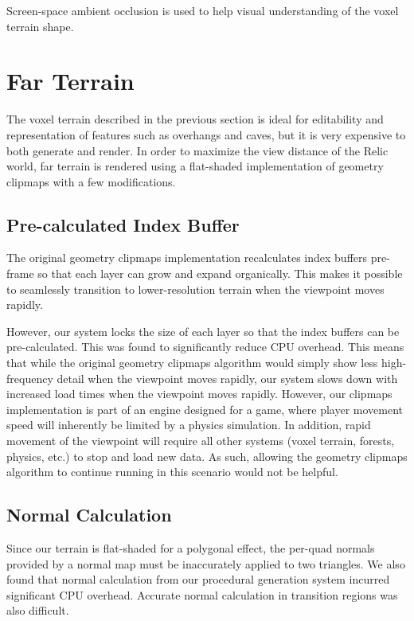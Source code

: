 Screen-space ambient occlusion is used to help visual understanding of the voxel terrain shape.


\section{Far Terrain} \label{clipterrain} %

The voxel terrain described in the previous section is ideal for editability and representation of features such as overhangs and caves, but it is very expensive to both generate and render.
In order to maximize the view distance of the Relic world, far terrain is rendered using a flat-shaded implementation of geometry clipmaps with a few modifications.

\subsection{Pre-calculated Index Buffer}

The original geometry clipmaps implementation recalculates index buffers pre-frame so that each layer can grow and expand organically.
This makes it possible to seamlessly transition to lower-resolution terrain when the viewpoint moves rapidly.

However, our system locks the size of each layer so that the index buffers can be pre-calculated.
This was found to significantly reduce CPU overhead.
This means that while the original geometry clipmaps algorithm would simply show less high-frequency detail when the viewpoint moves rapidly, our system slows down with increased load times when the viewpoint moves rapidly.
However, our clipmaps implementation is part of an engine designed for a game, where player movement speed will inherently be limited by a physics simulation.
In addition, rapid movement of the viewpoint will require all other systems (voxel terrain, forests, physics, etc.) to stop and load new data.
As such, allowing the geometry clipmaps algorithm to continue running in this scenario would not be helpful.

\subsection{Normal Calculation}

Since our terrain is flat-shaded for a polygonal effect, the per-quad normals provided by a normal map must be inaccurately applied to two triangles.
We also found that normal calculation from our procedural generation system incurred significant CPU overhead.
Accurate normal calculation in transition regions was also difficult.

